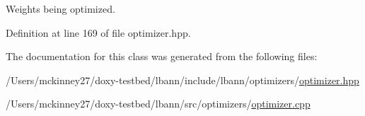 Weights being optimized. 

Definition at line 169 of file optimizer.\+hpp.



The documentation for this class was generated from the following files\+:\begin{DoxyCompactItemize}
\item 
/\+Users/mckinney27/doxy-\/testbed/lbann/include/lbann/optimizers/\hyperlink{optimizer_8hpp}{optimizer.\+hpp}\item 
/\+Users/mckinney27/doxy-\/testbed/lbann/src/optimizers/\hyperlink{optimizer_8cpp}{optimizer.\+cpp}\end{DoxyCompactItemize}
